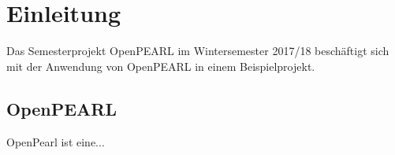 \chapter{Einleitung}

	Das Semesterprojekt OpenPEARL im Wintersemester 2017/18 beschäftigt sich mit der Anwendung von OpenPEARL in einem Beispielprojekt. 
	
	\section{OpenPEARL}
	OpenPearl ist eine...
	
	